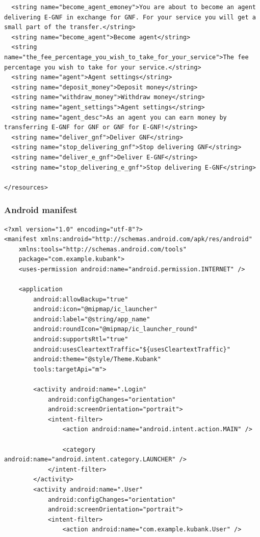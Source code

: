 \documentclass[11pt, a4paper]{article}
\begin{document}
\begin{appendices}
\begin{lstlisting}
  <string name="become_agent_emoney">You are about to become an agent delivering E-GNF in exchange for GNF. For your service you will get a small part of the transfer.</string>
  <string name="become_agent">Become agent</string>
  <string name="the_fee_percentage_you_wish_to_take_for_your_service">The fee percentage you wish to take for your service.</string>
  <string name="agent">Agent settings</string>
  <string name="deposit_money">Deposit money</string>
  <string name="withdraw_money">Withdraw money</string>
  <string name="agent_settings">Agent settings</string>
  <string name="agent_desc">As an agent you can earn money by transferring E-GNF for GNF or GNF for E-GNF!</string>
  <string name="deliver_gnf">Deliver GNF</string>
  <string name="stop_delivering_gnf">Stop delivering GNF</string>
  <string name="deliver_e_gnf">Deliver E-GNF</string>
  <string name="stop_delivering_e_gnf">Stop delivering E-GNF</string>

</resources>
\end{lstlisting}
\subsubsection{Android manifest}
\begin{lstlisting}
<?xml version="1.0" encoding="utf-8"?>
<manifest xmlns:android="http://schemas.android.com/apk/res/android"
    xmlns:tools="http://schemas.android.com/tools"
    package="com.example.kubank">
    <uses-permission android:name="android.permission.INTERNET" />

    <application
        android:allowBackup="true"
        android:icon="@mipmap/ic_launcher"
        android:label="@string/app_name"
        android:roundIcon="@mipmap/ic_launcher_round"
        android:supportsRtl="true"
        android:usesCleartextTraffic="${usesCleartextTraffic}"
        android:theme="@style/Theme.Kubank"
        tools:targetApi="m">

        <activity android:name=".Login"
            android:configChanges="orientation"
            android:screenOrientation="portrait">
            <intent-filter>
                <action android:name="android.intent.action.MAIN" />

                <category android:name="android.intent.category.LAUNCHER" />
            </intent-filter>
        </activity>
        <activity android:name=".User"
            android:configChanges="orientation"
            android:screenOrientation="portrait">
            <intent-filter>
                <action android:name="com.example.kubank.User" />


\end{lstlisting}
\end{appendices}
\end{document}
